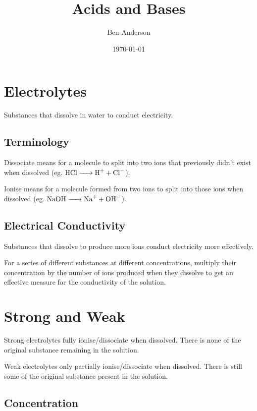 \documentclass[a4paper,11pt]{article}
\begin{document}
\title{Acids and Bases}
\author{Ben Anderson}
\date{\today}
\maketitle
\pagebreak

\tableofcontents
\pagebreak


\section{Electrolytes}

Substances that dissolve in water to conduct electricity.


\subsection{Terminology}

Dissociate means for a molecule to split into two ions that previously didn't
exist when dissolved (eg. $\ce{HCl -> H+ + Cl-}$).

Ionise means for a molecule formed from two ions to split into those ions when
dissolved (eg. $\ce{NaOH -> Na+ + OH-}$).


\subsection{Electrical Conductivity}

Substances that dissolve to produce more ions conduct electricity more
effectively.

For a series of different substances at different concentrations, multiply their
concentration by the number of ions produced when they dissolve to get an
effective measure for the conductivity of the solution.


\section{Strong and Weak}

Strong electrolytes fully ionise/dissociate when dissolved. There is none of the
original substance remaining in the solution.

Weak electrolytes only partially ionise/dissociate when dissolved. There is
still some of the original substance present in the solution.


\subsection{Concentration}
\end{document}

